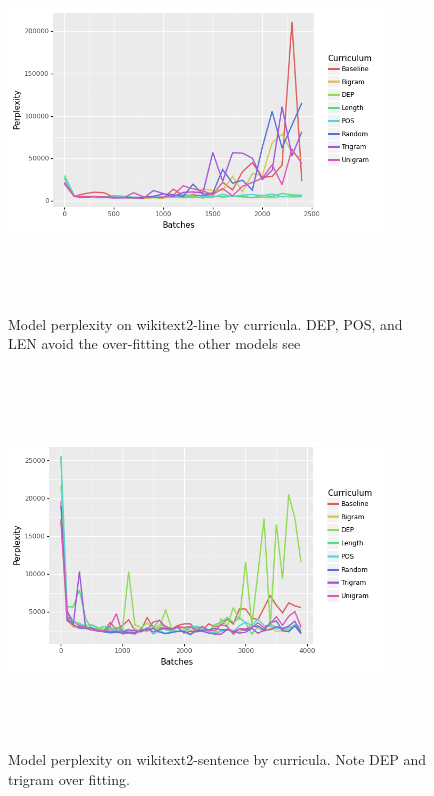 \begin{figure}[h]
\centering
\label{fig:wikitext2-line-perplexity}
\includegraphics[width=10cm, height=10cm]{Thesis/images/wikitext-2line.png}
\caption{Model perplexity on wikitext2-line by curricula. DEP, POS, and LEN avoid the over-fitting the other models see}
\end{figure}



\begin{figure}[h]
\centering
\label{fig:wikitext2-sentence-perplexity}
\includegraphics[width=10cm, height=10cm]{Thesis/images/wikitext-2sentence.png}
\caption{Model perplexity on wikitext2-sentence by curricula. Note DEP and trigram over fitting.}
\end{figure}

